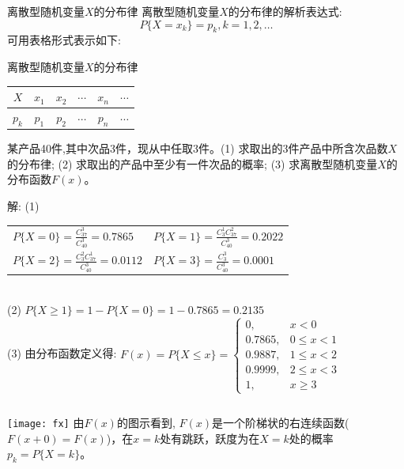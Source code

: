 \begin{frame}{离散型随机变量$X$的分布律}
离散型随机变量$X$的分布律的解析表达式:
	\[P\{X=x_k\}=p_k, k=1,2,\dots\]
可用表格形式表示如下:
\begin{block}{离散型随机变量$X$的分布律}
	\begin{tabular}{c|ccccc}
		$X$ & $x_1$ & $x_2$ & $\cdots$ & $x_n$ & $\cdots$\\ 
		\hline 
		$p_k$ & $p_1$ & $p_2$ & $\cdots$ & $p_n$ & $\cdots$\\ 
	\end{tabular} 
\end{block}

\begin{example}
	某产品40件,其中次品3件，现从中任取3件。(1) 求取出的3件产品中所含次品数$X$的分布律; (2) 求取出的产品中至少有一件次品的概率; (3) 求离散型随机变量$X$的分布函数$F(x)$。
\end{example}
\end{frame}

\begin{frame}
\begin{block}{解:}
(1) \begin{tabular}{ll}
	$P\{X=0\}=\frac{C_{37}^{3}}{C_{40}^{3}}=0.7865$ & $P\{X=1\}=\frac{C_{3}^{1}C_{37}^{2}}{C_{40}^{3}}=0.2022$ \\ 
	$P\{X=2\}=\frac{C_{3}^{2}C_{37}^{1}}{C_{40}^{3}}=0.0112$ & $P\{X=3\}=\frac{C_{3}^{3}}{C_{40}^{3}}=0.0001$ \\ 
\end{tabular}\\ 
(2) \quad $P\{X\ge 1\}=1-P\{X=0\}=1-0.7865=0.2135$\\
(3) 由分布函数定义得:
$F(x)=P\{X\le x\} =
\begin{cases}
0,      & x<0 \\
0.7865, & 0\le x<1 \\
0.9887, & 1\le x<2 \\
0.9999, & 2\le x<3 \\
1,      & x\ge 3
\end{cases} $
\begin{columns}%
	\texttt{[image: fx]}
	由$F(x)$的图示看到, $F(x)$是一个阶梯状的右连续函数($F(x+0)=F(x)$)，在$x=k$处有跳跃，跃度为在$X=k$处的概率$p_k=P\{X=k\}$。	
\end{columns}
\end{block}
\end{frame}

